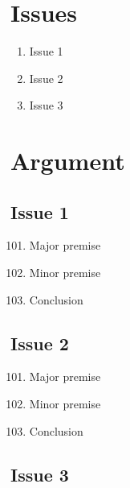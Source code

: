 \pagebreak

\section{Issues}

\begin{enumerate}
    \item Issue 1
    
    \item Issue 2
    
    \item Issue 3
    
\end{enumerate}

\pagebreak

\section{Argument}

\subsection{Issue 1}

\begin{enumerate}
    \setcounter{enumi}{100}
    \item Major premise
    \item Minor premise
    \item Conclusion
    
\end{enumerate}

\break

\subsection{Issue 2}

\begin{enumerate}
    \setcounter{enumi}{100}
    \item Major premise
    \item Minor premise
    \item Conclusion
    
\end{enumerate}

\break

\subsection{Issue 3}

